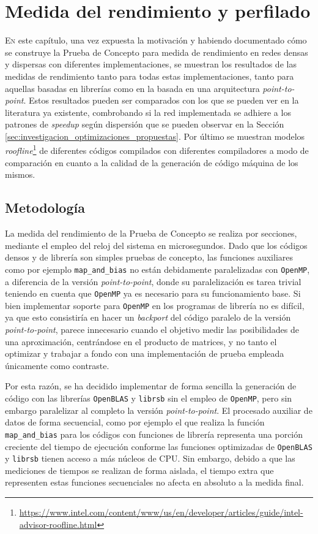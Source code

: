 \chapter{Medida del rendimiento y perfilado}
\label{chap:medida_rendimiento_perfilado}

\lettrine{E}{n} este capítulo, una vez expuesta la motivación y habiendo documentado cómo se construye la Prueba de Concepto para medida de rendimiento en redes densas y dispersas con diferentes implementaciones, se muestran los resultados de las medidas de rendimiento tanto para todas estas implementaciones, tanto para aquellas basadas en librerías como en la basada en una arquitectura \textit{point-to-point}. Estos resultados pueden ser comparados con los que se pueden ver en la literatura ya existente, combrobando si la red implementada se adhiere a los patrones de \textit{speedup} según dispersión que se pueden observar en la Sección \ref{sec:investigacion_optimizaciones_propuestas}. Por último se muestran modelos \textit{roofline}\footnote{\url{https://www.intel.com/content/www/us/en/developer/articles/guide/intel-advisor-roofline.html}} de diferentes códigos compilados con diferentes compiladores a modo de comparación en cuanto a la calidad de la generación de código máquina de los mismos.

\section{Metodología}
\label{sec:metodologia}
La medida del rendimiento de la Prueba de Concepto se realiza por secciones, mediante el empleo del reloj del sistema en microsegundos. Dado que los códigos densos y de librería son simples pruebas de concepto, las funciones auxiliares como por ejemplo \texttt{map\_and\_bias} no están debidamente paralelizadas con \texttt{OpenMP}, a diferencia de la versión \textit{point-to-point}, donde su paralelización es tarea trivial teniendo en cuenta que \texttt{OpenMP} ya es necesario para su funcionamiento base. Si bien implementar soporte para \texttt{OpenMP} en los programas de librería no es difícil, ya que esto consistiría en hacer un \textit{backport} del código paralelo de la versión \textit{point-to-point}, parece innecesario cuando el objetivo medir las posibilidades de una aproximación, centrándose en el producto de matrices, y no tanto el optimizar y trabajar a fondo con una implementación de prueba empleada únicamente como contraste.

Por esta razón, se ha decidido implementar de forma sencilla la generación de código con las librerías \texttt{OpenBLAS} y \texttt{librsb} sin el empleo de \texttt{OpenMP}, pero sin embargo paralelizar al completo la versión \textit{point-to-point}. El procesado auxiliar de datos de forma secuencial, como por ejemplo el que realiza la función \texttt{map\_and\_bias} para los códigos con funciones de librería representa una porción creciente del tiempo de ejecución conforme las funciones optimizadas de \texttt{OpenBLAS} y \texttt{librsb} tienen acceso a más núcleos de CPU. Sin embargo, debido a que las mediciones de tiempos se realizan de forma aislada, el tiempo extra que representen estas funciones secuenciales no afecta en absoluto a la medida final.

